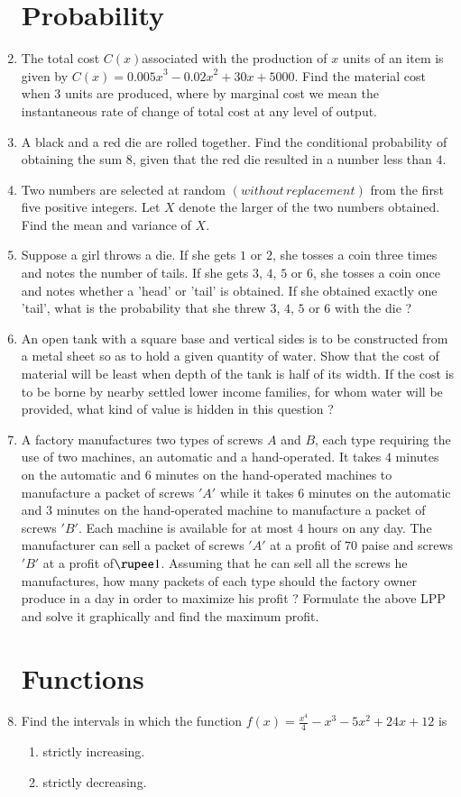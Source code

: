 \documentclass[10pt,-letter paper]{article}
\providecommand{\brak}[1]{\ensuremath{\left(#1\right)}}
\begin{document}
\begin{enumerate}
 \section{Probability}
\item The total cost $C\brak{x}$associated with the production of $x$ units of an item is given by $C\brak{x} = {0.005x}^3-{0.02x}^2+30x+5000$. Find the material cost when $3$ units are produced, where by marginal cost we mean the instantaneous rate of change of total cost at any level of output.

\item A black and a red die are rolled together. Find the conditional probability of obtaining the sum $8$, given that the red die resulted in a number less than $4$.
\item Two numbers are selected at random \brak{without\hspace{2pt}replacement} from the first five positive integers. Let $X$ denote the larger of the two numbers obtained. Find the mean and variance of $X$.
\item  Suppose a girl throws a die. If she gets $1$ or $2$, she tosses a coin three times and notes the number of tails. If she gets $3$, $4$, $5$ or $6$, she tosses a coin once and notes whether a 'head' or 'tail' is obtained. If she obtained exactly one 'tail', what is the probability that she threw $3$, $4$, $5$ or $6$ with the die ? 

\item An open tank with a square base and vertical sides is to be constructed from a metal sheet so as to hold a given quantity of water. Show that the cost of material will be least when depth of the tank is half of its width. If the cost is to be borne by nearby settled lower income families, for whom water will be provided, what kind of value is hidden in this question ?

\item A factory manufactures two types of screws $A$ and $B$, each type requiring the use of two machines, an automatic and a hand-operated. It takes $4$ minutes on the automatic and $6$ minutes on the hand-operated machines to manufacture a packet of screws $'A'$ while it takes $6$ minutes on the automatic and $3$ minutes on the hand-operated machine to manufacture a packet of screws $'B'$. Each machine is available for at most $4$ hours on any day. The manufacturer can sell a packet of screws $'A'$ at a profit of $70$ paise and screws $'B'$ at a profit of$\rupee 1$. Assuming that he can sell all the screws he manufactures, how many packets of each type should the factory owner produce in a day in order to maximize his profit ? Formulate the above LPP and solve it graphically and find the maximum profit.

\section{Functions}
\item Find the intervals in which the function $f\brak{x}=\frac{x^4}{4}-x^{3}-5x^{2}+24x+12 $ is 
\begin{enumerate}
  \item strictly increasing.
 \item strictly decreasing.
\end{enumerate}


\end{enumerate}
\end{document}
